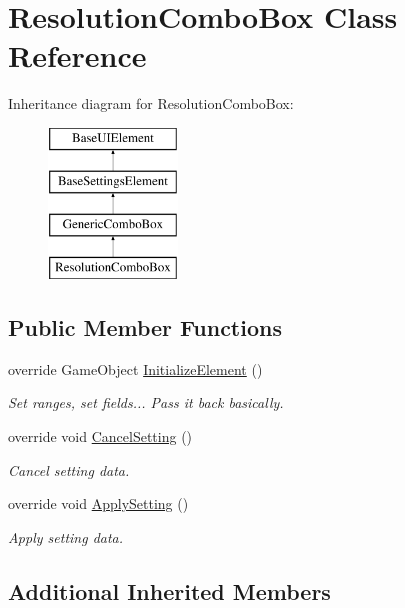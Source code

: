 \hypertarget{class_resolution_combo_box}{}\section{Resolution\+Combo\+Box Class Reference}
\label{class_resolution_combo_box}
Inheritance diagram for Resolution\+Combo\+Box\+:\begin{figure}[H]
\begin{center}
\leavevmode
\includegraphics[height=4.000000cm]{class_resolution_combo_box}
\end{center}
\end{figure}
\subsection*{Public Member Functions}
\begin{DoxyCompactItemize}
\item 
override Game\+Object \hyperlink{class_resolution_combo_box_a226f4bbab7c3729cb67a681b4adaec3d}{Initialize\+Element} ()
\begin{DoxyCompactList}\small\item\em Set ranges, set fields... Pass it back basically. \end{DoxyCompactList}\item 
override void \hyperlink{class_resolution_combo_box_a0c831260eeb5fe60b9cb655693af4fa2}{Cancel\+Setting} ()
\begin{DoxyCompactList}\small\item\em Cancel setting data. \end{DoxyCompactList}\item 
override void \hyperlink{class_resolution_combo_box_ae2069c493be08045148b0e260b2112c9}{Apply\+Setting} ()
\begin{DoxyCompactList}\small\item\em Apply setting data. \end{DoxyCompactList}\end{DoxyCompactItemize}
\subsection*{Additional Inherited Members}


